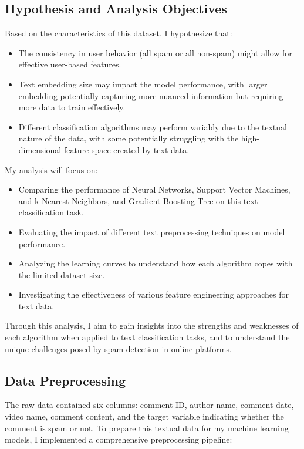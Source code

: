 \documentclass[conference]{IEEEtran}
\begin{document}
\subsection{Hypothesis and Analysis Objectives}
Based on the characteristics of this dataset, I hypothesize that:
\begin{itemize}
    \item The consistency in user behavior (all spam or all non-spam) might allow for effective user-based features.
    \item Text embedding size may impact the model performance, with larger embedding potentially capturing more nuanced information but requiring more data to train effectively.
    \item Different classification algorithms may perform variably due to the textual nature of the data, with some potentially struggling with the high-dimensional feature space created by text data.
\end{itemize}

My analysis will focus on:
\begin{itemize}
    \item Comparing the performance of Neural Networks, Support Vector Machines, and k-Nearest Neighbors, and Gradient Boosting Tree on this text classification task.
    \item Evaluating the impact of different text preprocessing techniques on model performance.
    \item Analyzing the learning curves to understand how each algorithm copes with the limited dataset size.
    \item Investigating the effectiveness of various feature engineering approaches for text data.
\end{itemize}

Through this analysis, I aim to gain insights into the strengths and weaknesses of each algorithm when applied to text classification tasks, and to understand the unique challenges posed by spam detection in online platforms.
\subsection{Data Preprocessing}

The raw data contained six columns: comment ID, author name, comment date, video name, comment content, and the target variable indicating whether the comment is spam or not. To prepare this textual data for my machine learning models, I implemented a comprehensive preprocessing pipeline:
\end{document}
